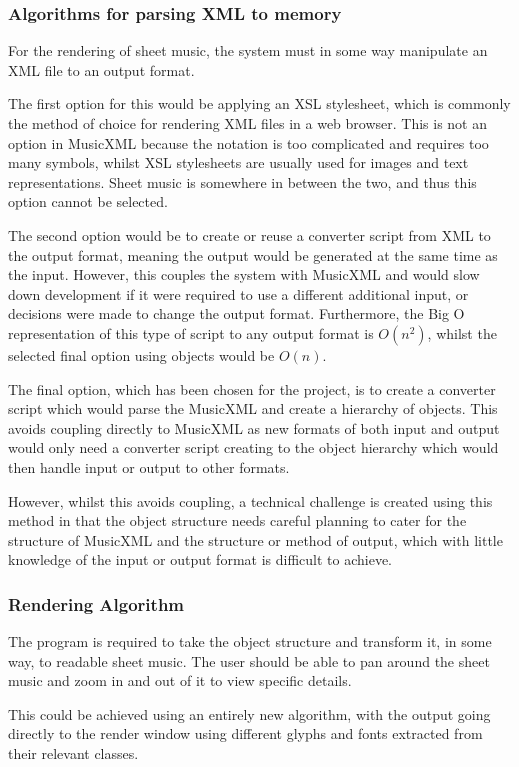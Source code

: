 \subsubsection{Algorithms for parsing XML to memory}
For the rendering of sheet music, the system must in some way manipulate an XML file to an output format.

The first option for this would be applying an XSL stylesheet, which is commonly the method of choice for rendering XML files in a web browser. This is not an option in MusicXML because the notation is too complicated and requires too many symbols, whilst XSL stylesheets are usually used for images and text representations. Sheet music is somewhere in between the two, and thus this option cannot be selected.

The second option would be to create or reuse a converter script from XML to the output format, meaning the output would be generated at the same time as the input. However, this couples the system with MusicXML and would slow down development if it were required to use a different additional input, or decisions were made to change the output format. Furthermore, the Big O representation of this type of script to any output format is $O(n^2)$, whilst the selected final option using objects would be $O(n)$.

The final option, which has been chosen for the project, is to create a converter script which would parse the MusicXML and create a hierarchy of objects. This avoids coupling directly to MusicXML as new formats of both input and output would only need a converter script creating to the object hierarchy which would then handle input or output to other formats.

However, whilst this avoids coupling, a technical challenge is created using this method in that the object structure needs careful planning to cater for the structure of MusicXML and the structure or method of output, which with little knowledge of the input or output format is difficult to achieve.

\subsubsection{Rendering Algorithm}
The program is required to take the object structure and transform it, in some way, to readable sheet music. The user should be able to pan around the sheet music and zoom in and out of it to view specific details.

This could be achieved using an entirely new algorithm, with the output going directly to the render window using different glyphs and fonts extracted from their relevant classes.

